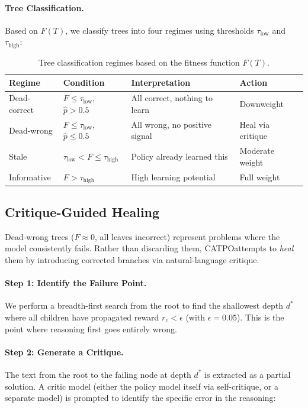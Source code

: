 \documentclass{article} %
\newcommand{\CATPO}{\textsc{CATPO}}
\begin{document}
\paragraph{Tree Classification.} Based on $F(T)$, we classify trees into four regimes using thresholds $\tau_\text{low}$ and $\tau_\text{high}$:

\begin{table}[h]
\centering
\small
\begin{tabular}{llll}
\toprule
\textbf{Regime} & \textbf{Condition} & \textbf{Interpretation} & \textbf{Action} \\
\midrule
Dead-correct & $F \le \tau_\text{low}$, $\hat{p} > 0.5$ & All correct, nothing to learn & Downweight \\
Dead-wrong & $F \le \tau_\text{low}$, $\hat{p} \le 0.5$ & All wrong, no positive signal & Heal via critique \\
Stale & $\tau_\text{low} < F \le \tau_\text{high}$ & Policy already learned this & Moderate weight \\
Informative & $F > \tau_\text{high}$ & High learning potential & Full weight \\
\bottomrule
\end{tabular}
\caption{Tree classification regimes based on the fitness function $F(T)$.}
\label{tab:regimes}
\end{table}


\subsection{Critique-Guided Healing}
\label{sec:healing}

Dead-wrong trees ($F \approx 0$, all leaves incorrect) represent problems where the model consistently fails. Rather than discarding them, \CATPO attempts to \emph{heal} them by introducing corrected branches via natural-language critique.

\paragraph{Step 1: Identify the Failure Point.} We perform a breadth-first search from the root to find the shallowest depth $d^*$ where all children have propagated reward $r_c < \epsilon$ (with $\epsilon = 0.05$). This is the point where reasoning first goes entirely wrong.

\paragraph{Step 2: Generate a Critique.} The text from the root to the failing node at depth $d^*$ is extracted as a partial solution. A critic model (either the policy model itself via self-critique, or a separate model) is prompted to identify the specific error in the reasoning:
\end{document}
